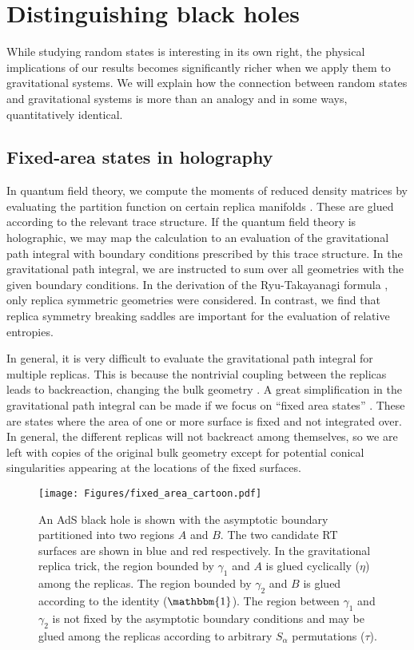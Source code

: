 \documentclass[a4paper,11pt]{article}
\begin{document}
\section{Distinguishing black holes}
\label{black_hole_sec}

While studying random states is interesting in its own right, the physical implications of our results becomes significantly richer when we apply them to gravitational systems. We will explain how the connection between random states and gravitational systems is more than an analogy and in some ways, quantitatively identical. 

\subsection{Fixed-area states in holography}

In quantum field theory, we compute the moments of reduced density matrices by evaluating the partition function on certain replica manifolds \cite{1994NuPhB.424..443H,2004JSMTE..06..002C}. These are glued according to the relevant trace structure. If the quantum field theory is holographic, we may map the calculation to an evaluation of the gravitational path integral with boundary conditions prescribed by this trace structure. In the gravitational path integral, we are instructed to sum over all geometries with the given boundary conditions. In the derivation of the Ryu-Takayanagi formula \cite{2013JHEP...08..090L}, only replica symmetric geometries were considered. In contrast, we find that replica symmetry breaking saddles are important for the evaluation of relative entropies.

In general, it is very difficult to evaluate the gravitational path integral for multiple replicas. This is because the nontrivial coupling between the replicas leads to backreaction, changing the bulk geometry \cite{2016NatCo...712472D}. A great simplification in the gravitational path integral can be made if we focus on ``fixed area states'' \cite{2019JHEP...05..052A,2019JHEP...10..240D}. These are states where the area of one or more surface is fixed and not integrated over. In general, the different replicas will not backreact among themselves, so we are left with copies of the original bulk geometry except for potential conical singularities appearing at the locations of the fixed surfaces. 

\begin{figure}
    \centering
    \texttt{[image: Figures/fixed\_area\_cartoon.pdf]}
    \caption{An AdS black hole is shown with the asymptotic boundary partitioned into two regions $A$ and $B$. The two candidate RT surfaces are shown in blue and red respectively. In the gravitational replica trick, the region bounded by $\gamma_1$ and $A$ is glued cyclically ($\eta$) among the replicas. The region bounded by $\gamma_2$ and $B$ is glued according to the identity ($\mathbbm{1}$). The region between $\gamma_1$ and $\gamma_2$ is not fixed by the asymptotic boundary conditions and may be glued among the replicas according to arbitrary $S_{\alpha}$ permutations ($\tau$).}
    \label{fixed_area_cartoon} 
\end{figure}
\end{document}
